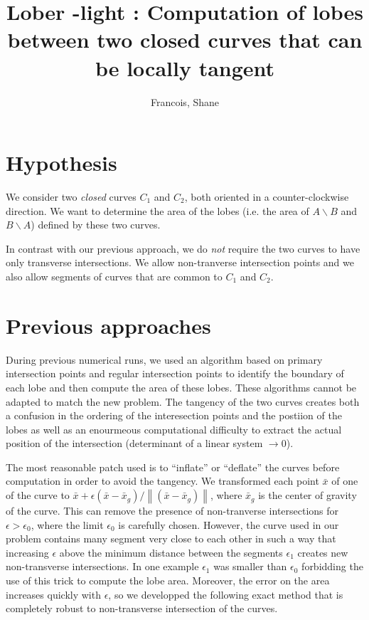 \documentclass{article}
\begin{document}
\title{Lober -light : Computation of lobes between two closed curves that can be locally tangent}

\author{Francois, Shane}

\maketitle

\section{Hypothesis}

We consider two {\em closed} curves $C_1$ and $C_2$, both oriented in a counter-clockwise direction. We want to determine the area of the lobes (i.e. the area of $A\backslash B$ and $B\backslash A$) defined by these two curves. 

In contrast with our previous approach, we do {\em not} require the two curves to have only transverse intersections. We allow non-tranverse intersection points and we also allow segments of curves that are common to $C_1$ and $C_2$.

\section{Previous approaches}

During previous numerical runs, we used an algorithm based on primary intersection points and regular intersection points to identify the boundary of each lobe and then compute the area of these lobes. These algorithms cannot be adapted to match the new problem. The tangency of the two curves creates both a confusion in the ordering of the interesection points and the postiion of the lobes as well as an enourmeous computational difficulty to extract the actual position of the intersection (determinant of a linear system $\to 0$).

The most reasonable patch used is to ``inflate'' or ``deflate'' the curves before computation in order to avoid the tangency. We transformed each point $\bar{x}$ of one of the curve to $\bar{x} + \epsilon (\bar{x}-\bar{x}_g) / \left\| (\bar{x}-\bar{x}_g) \right\| $, where $\bar{x}_g$ is the center of gravity of the curve. This can remove the presence of non-tranverse intersections for $\epsilon > \epsilon _0$, where the limit $\epsilon _0$ is carefully chosen. However, the curve used in our problem contains many segment very close to each other in such a way that increasing $\epsilon $ above the minimum distance between the segments $\epsilon _1 $ creates new non-transverse intersections. In one example $\epsilon _1 $ was smaller than $\epsilon _0$ forbidding the use of this trick to compute the lobe area. Moreover, the error on the area increases quickly with $\epsilon$, so we developped the following exact method that is completely robust to non-transverse intersection of the curves.
\end{document}
